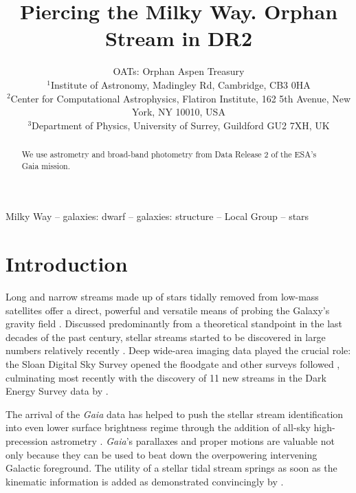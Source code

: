 \documentclass[a4paper,useAMS,usenatbib]{mnras}
\title[Orphan Stream in \gaia DR2]{Piercing the Milky Way. Orphan
  Stream in \gaia DR2}
\author[OATs]{OATs: Orphan Aspen Treasury\\
  $^{1}$Institute of Astronomy, Madingley Rd, Cambridge, CB3 0HA\\
  $^{2}$Center for Computational Astrophysics, Flatiron Institute, 162 5th Avenue, New York, NY 10010, USA\\
  $^{3}$Department of Physics, University of Surrey, Guildford GU2 7XH, UK\\
}
\newcommand{\Gaia}{{\it Gaia}}
\newcommand{\gaia}{\textit{Gaia} }
\begin{document}
\maketitle

\label{firstpage}

\begin{abstract}
We use astrometry and broad-band photometry from Data Release 2 of the
ESA's Gaia mission.

\end{abstract}

\begin{keywords}
Milky Way -- galaxies: dwarf -- galaxies: structure -- Local Group -- stars
\end{keywords}

\section{Introduction}

Long and narrow streams made up of stars tidally removed from low-mass
satellites offer a direct, powerful and versatile means of probing the
Galaxy's gravity field \citep[see e.g.][]{Donald1982, Kuhn1993,
  Donald1995,Johnston1996,Helmi1999,Johnston1999,Murali1999}. Discussed
predominantly from a theoretical standpoint in the last decades of the
past century, stellar streams started to be discovered in large
numbers relatively recently
\citep[e.g.][]{Ibata2001,Odenkirchen2001,Newberg2002,
  Majewski2003,FOS,Grillmair2006}. Deep wide-area imaging data played
the crucial role: the Sloan Digital Sky Survey \citep[SDSS,
  see][]{Gunn1998,York2000,SDSS_DR8,SDSS_DR12} opened the floodgate
\citep[e.g.][]{OS_C,OS_V,Grillmair2009,Newberg2009,Koposov2012,
  Bonaca2012} and other surveys followed
\citep[e.g.][]{Koposov2014,Bernard2016,Balbinot2016}, culminating most
recently with the discovery of 11 new streams in the Dark Energy
Survey \citep[DES, see][]{DES2005,DES2016} data by \citet{Shipp2018}.

The arrival of the \gaia data \citep[see][]{Prusti2016, Brown2018} has
helped to push the stellar stream identification into even lower
surface brightness regime through the addition of all-sky
high-precession astrometry
\citep[see][]{Myeong2018,Ibata2018,Koppelman2018,Malhan2018,Adrian2018,CloudsArms}.
\Gaia's parallaxes and proper motions are valuable not only because
they can be used to beat down the overpowering intervening Galactic
foreground. The utility of a stellar tidal stream springs as soon as
the kinematic information is added as demonstrated convincingly by
\citet{Koposov2010}. 
\end{document}

